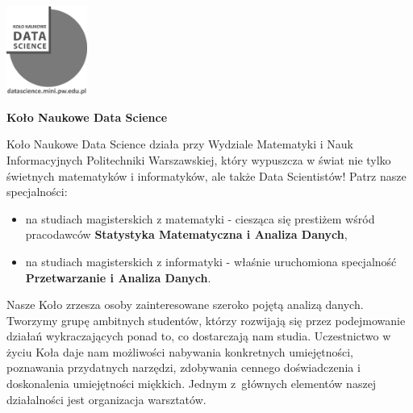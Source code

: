 \documentclass[\main/boa.tex]{subfiles}
\begin{document}
	\begin{minipage}[t]{0.915\textwidth}
		\center     
		\includegraphics[width=100px]{img/logos.bw/knds_logo.png} 
	\end{minipage}
\begin{center}
\Large \textbf {Koło Naukowe Data Science}
\end{center}

\vskip 0.3cm
\normalsize 
Koło Naukowe Data Science działa przy Wydziale Matematyki i Nauk Informacyjnych Politechniki Warszawskiej, który wypuszcza w świat nie tylko świetnych matematyków i informatyków, ale także Data Scientistów! Patrz nasze specjalności:

\begin{itemize}
\item na studiach magisterskich z matematyki - ciesząca się prestiżem wśród pracodawców \textbf{Statystyka Matematyczna i Analiza Danych},
\item na studiach magisterskich z informatyki - właśnie uruchomiona specjalność \\ \textbf{Przetwarzanie i Analiza Danych}.
\end{itemize}

Nasze Koło zrzesza osoby zainteresowane szeroko pojętą analizą danych. Tworzymy grupę ambitnych studentów, którzy rozwijają się przez podejmowanie działań wykraczających ponad to, co dostarczają nam studia. Uczestnictwo w życiu Koła daje nam możliwości nabywania konkretnych umiejętności, poznawania przydatnych narzędzi, zdobywania cennego doświadczenia i doskonalenia umiejętności miękkich. Jednym z~głównych elementów naszej działalności jest organizacja warsztatów. 
\end{document}
